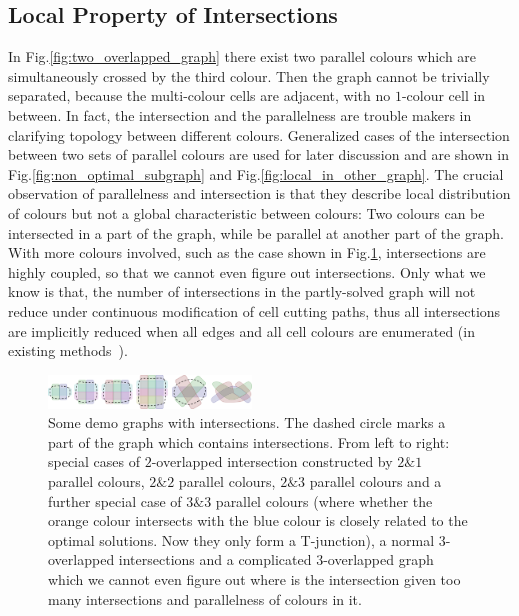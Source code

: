 \documentclass[conference]{IEEEtran}
\begin{document}
\subsection{Local Property of Intersections}
In Fig.\ref{fig:two_overlapped_graph} there exist two parallel colours which are simultaneously crossed by the third colour. Then the graph cannot be trivially separated, because the multi-colour cells are adjacent, with no $1$-colour cell in between. 
In fact, the intersection and the parallelness are trouble makers in clarifying topology between different colours. Generalized cases of the intersection between two sets of parallel colours are used for later discussion and are shown in Fig.\ref{fig:non_optimal_subgraph} and Fig.\ref{fig:local_in_other_graph}. 
The crucial observation of parallelness and intersection is that they describe local distribution of colours but not a global characteristic between colours: Two colours can be intersected in a part of the graph, while be parallel at another part of the graph. 
With more colours involved, such as the case shown in Fig.\ref{fig:three_overlapped_graph}, intersections are highly coupled, so that we cannot even figure out intersections. Only what we know is that, the number of intersections in the partly-solved graph will not reduce under continuous modification of cell cutting paths, thus all intersections are implicitly reduced when all edges and all cell colours are enumerated (in existing methods~\cite{Yang2020Cellular}). 

\begin{figure}[t]
\centering
\includegraphics[width = 0.48\textwidth]{figures/three_overlapped_graph_2}
\caption{Some demo graphs with intersections. 
The dashed circle marks a part of the graph which contains intersections. 
From left to right: special cases of $2$-overlapped intersection constructed by $2\&1$ parallel colours, $2\&2$ parallel colours, $2\&3$ parallel colours and a further special case of $3\&3$ parallel colours (where whether the orange colour intersects with the blue colour is closely related to the optimal solutions. Now they only form a T-junction), a normal $3$-overlapped intersections and a complicated $3$-overlapped graph which we cannot even figure out where is the intersection given too many intersections and parallelness of colours in it. }\label{fig:three_overlapped_graph}
\end{figure}
\end{document}
